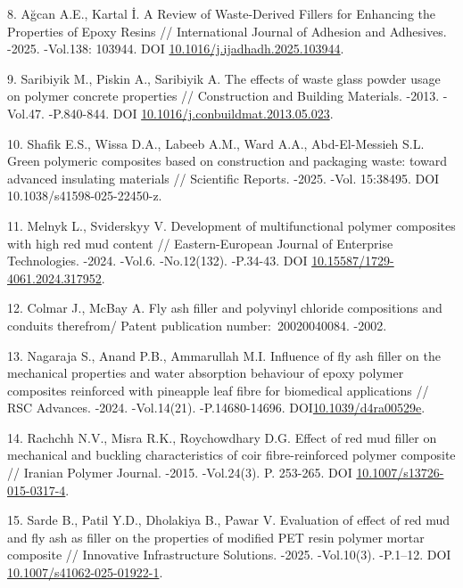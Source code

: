 \begin{refs}
8. Ağcan A.E., Kartal İ. A Review of Waste-Derived Fillers for Enhancing
the Properties of Epoxy Resins // International Journal of Adhesion and
Adhesives. -2025. -Vol.138: 103944. DOI
\href{https://doi.org/10.1016/j.ijadhadh.2025.103944}{10.1016/j.ijadhadh.2025.103944}.

9. Saribiyik M., Piskin A., Saribiyik A. The effects of waste glass
powder usage on polymer concrete properties // Construction and Building
Materials. -2013. -Vol.47. -P.840-844. DOI
\href{https://doi.org/10.1016/j.conbuildmat.2013.05.023}{10.1016/j.conbuildmat.2013.05.023}.

10. Shafik E.S., Wissa D.A., Labeeb A.M., Ward A.A., Abd-El-Messieh S.L.
Green polymeric composites based on construction and packaging waste:
toward advanced insulating materials // Scientific Reports. -2025. -Vol.
15:38495. DOI 10.1038/s41598-025-22450-z.

11. Melnyk L., Sviderskyy V. Development of multifunctional polymer
composites with high red mud content // Eastern-European Journal of
Enterprise Technologies. -2024. -Vol.6. -No.12(132). -P.34-43. DOI
\href{https://doi.org/10.15587/1729-4061.2024.317952}{10.15587/1729-4061.2024.317952}.

12. Colmar J., McBay A. Fly ash filler and polyvinyl chloride
compositions and conduits therefrom/ Patent publication
number:~20020040084. -2002.

13. Nagaraja S., Anand P.B., Ammarullah M.I. Influence of fly ash filler
on the mechanical properties and water absorption behaviour of epoxy
polymer composites reinforced with pineapple leaf fibre for biomedical
applications // RSC Advances. -2024. -Vol.14(21). -P.14680-14696.
DOI\href{https://doi.org/10.1039/d4ra00529e}{10.1039/d4ra00529e}.

14. Rachchh N.V., Misra R.K., Roychowdhary D.G. Effect of red mud filler
on mechanical and buckling characteristics of coir fibre-reinforced
polymer composite // Iranian Polymer Journal. -2015. -Vol.24(3). P.
253-265. DOI
\href{https://doi.org/10.1007/s13726-015-0317-4?urlappend=\%3Futm_source\%3Dresearchgate.net\%26utm_medium\%3Darticle}{10.1007/s13726-015-0317-4}.

15. Sarde B., Patil Y.D., Dholakiya B., Pawar V. Evaluation of effect of
red mud and fly ash as filler on the properties of modified PET resin
polymer mortar composite // Innovative Infrastructure Solutions. -2025.
-Vol.10(3). -P.1--12. DOI
\href{https://ui.adsabs.harvard.edu/link_gateway/2025InnIS..10..117S/doi:10.1007/s41062-025-01922-1}{10.1007/s41062-025-01922-1}.


\end{refs}
